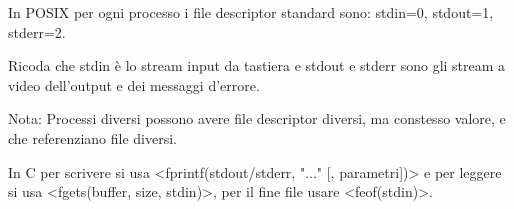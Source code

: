 In POSIX per ogni processo i file descriptor standard sono: stdin=0, stdout=1, stderr=2.

Ricoda che stdin è lo stream input da tastiera e stdout e stderr sono gli stream a video dell'output e dei messaggi d'errore.

Nota: Processi diversi possono avere file descriptor diversi, ma constesso valore, e che referenziano file diversi.

In C per scrivere si usa <fprintf(stdout/stderr, "..." [, parametri])> e per leggere si usa <fgets(buffer, size, stdin)>, per il fine file usare <feof(stdin)>.